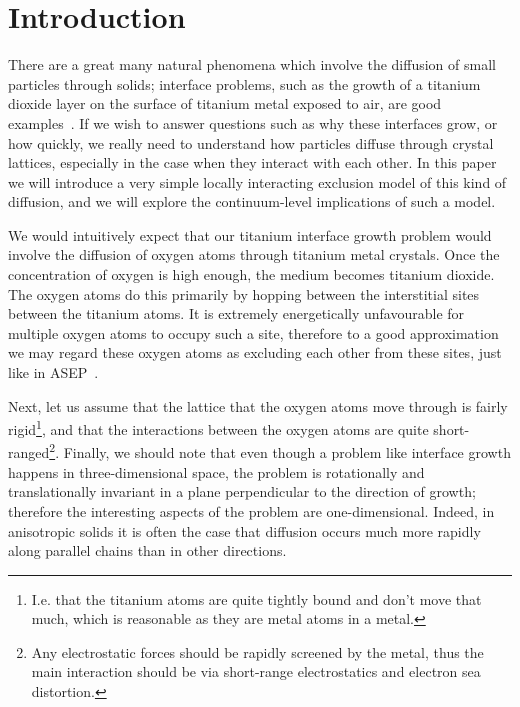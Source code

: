 \section{Introduction} \label{sec:intro}
There are a great many natural phenomena which involve the diffusion of small particles through solids; interface problems, such as the growth of a titanium dioxide layer on the surface of titanium metal exposed to air, are good examples~\cite{tegner2015high}.
If we wish to answer questions such as why these interfaces grow, or how quickly, we really need to understand how particles diffuse through crystal lattices, especially in the case when they interact with each other.
In this paper we will introduce a very simple locally interacting exclusion model of this kind of diffusion, and we will explore the continuum-level implications of such a model.

We would intuitively expect that our titanium interface growth problem would involve the diffusion of oxygen atoms through titanium metal crystals. Once the concentration of oxygen is high enough, the medium becomes titanium dioxide.
The oxygen atoms do this primarily by hopping between the interstitial sites between the titanium atoms.
It is extremely energetically unfavourable for multiple oxygen atoms to occupy such a site,
therefore to a good approximation we may regard these oxygen atoms as excluding each other from these sites, just like in ASEP~\cite{sugden2007dynamically, liggett1985interacting}.

Next, let us assume that the lattice that the oxygen atoms move through is fairly rigid\footnote{I.e. that the titanium atoms are quite tightly bound and don't move that much, which is reasonable as they are metal atoms in a metal.},
and that the interactions between the oxygen atoms are quite short-ranged\footnote{Any electrostatic forces should be rapidly screened by the metal, thus the main interaction should be via short-range electrostatics and electron sea distortion.}.
Finally, we should note that even though a problem like interface growth happens in three-dimensional space, the problem is rotationally and translationally invariant in a plane perpendicular to the direction of growth; therefore the
interesting aspects of the problem are one-dimensional. Indeed, in anisotropic solids it is often the case that diffusion occurs much more rapidly along parallel chains than in other directions.

